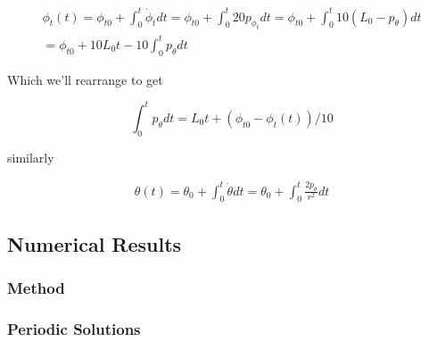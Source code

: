 \documentclass[12pt]{amsart}
\begin{document}
\begin{equation}
  \begin{multlined}
	\phi_t(t) 
	= \phi_{t0} + \int_0^t  \dot \phi_t  dt
	= \phi_{t0} + \int_0^t  20 p_{ \phi_t } dt
	= \phi_{t0} + \int_0^t  10 (L_0-p_{ \theta }) dt
	\\
	= \phi_{t0} + 10L_0t -10 \int_0^t  p_{ \theta } dt
  \end{multlined}
\end{equation}

Which we'll rearrange to get

\begin{equation}
	\int_0^t  p_{ \theta } dt
	= L_0t + (\phi_{t0}  - \phi_t(t))/10
\end{equation}

similarly

\begin{equation}
  \begin{multlined}
	\theta(t) 
	= \theta_{ 0} + \int_0^t  \dot \theta  dt
	= \theta_{ 0} + \int_0^t   \frac{2 p_{\theta}}{r^{2}} dt
  \end{multlined}
\end{equation}

\subsection{Numerical Results}
\subsubsection{Method}
\subsubsection{Periodic Solutions}
\end{document}
